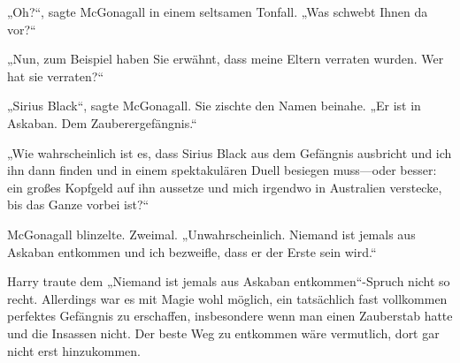 „Oh?“, sagte McGonagall in einem seltsamen Tonfall. „Was schwebt Ihnen da vor?“

„Nun, zum Beispiel haben Sie erwähnt, dass meine Eltern verraten wurden. Wer hat sie verraten?“

„Sirius Black“, sagte McGonagall. Sie zischte den Namen beinahe. „Er ist in Askaban. Dem Zauberergefängnis.“

„Wie wahrscheinlich ist es, dass Sirius Black aus dem Gefängnis ausbricht und ich ihn dann finden und in einem spektakulären Duell besiegen muss—oder besser: ein großes Kopfgeld auf ihn aussetze und mich irgendwo in Australien verstecke, bis das Ganze vorbei ist?“

McGonagall blinzelte. Zweimal. „Unwahrscheinlich. Niemand ist jemals aus Askaban entkommen und ich bezweifle, dass er der Erste sein wird.“

Harry traute dem „Niemand ist jemals aus Askaban entkommen“-Spruch nicht so recht. Allerdings war es mit Magie wohl möglich, ein tatsächlich fast vollkommen perfektes Gefängnis zu erschaffen, insbesondere wenn man einen Zauberstab hatte und die Insassen nicht. Der beste Weg zu entkommen wäre vermutlich, dort gar nicht erst hinzukommen.

